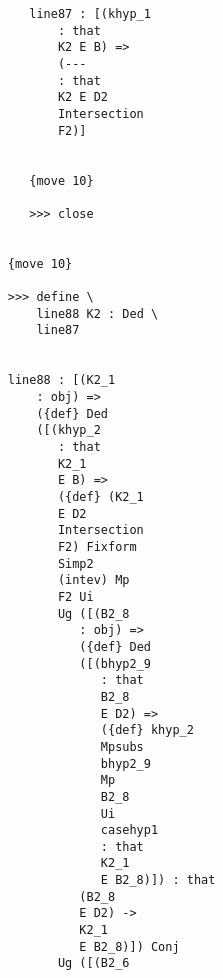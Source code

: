 \documentclass[12pt]{article}
\begin{document}
\begin{verbatim}
                                 line87 : [(khyp_1 
                                     : that 
                                     K2 E B) => 
                                     (--- 
                                     : that 
                                     K2 E D2 
                                     Intersection 
                                     F2)]


                                 {move 10}

                                 >>> close


                              {move 10}

                              >>> define \
                                  line88 K2 : Ded \
                                  line87


                              line88 : [(K2_1 
                                  : obj) => 
                                  ({def} Ded 
                                  ([(khyp_2 
                                     : that 
                                     K2_1 
                                     E B) => 
                                     ({def} (K2_1 
                                     E D2 
                                     Intersection 
                                     F2) Fixform 
                                     Simp2 
                                     (intev) Mp 
                                     F2 Ui 
                                     Ug ([(B2_8 
                                        : obj) => 
                                        ({def} Ded 
                                        ([(bhyp2_9 
                                           : that 
                                           B2_8 
                                           E D2) => 
                                           ({def} khyp_2 
                                           Mpsubs 
                                           bhyp2_9 
                                           Mp 
                                           B2_8 
                                           Ui 
                                           casehyp1 
                                           : that 
                                           K2_1 
                                           E B2_8)]) : that 
                                        (B2_8 
                                        E D2) -> 
                                        K2_1 
                                        E B2_8)]) Conj 
                                     Ug ([(B2_6 

\end{verbatim}
\end{document}
